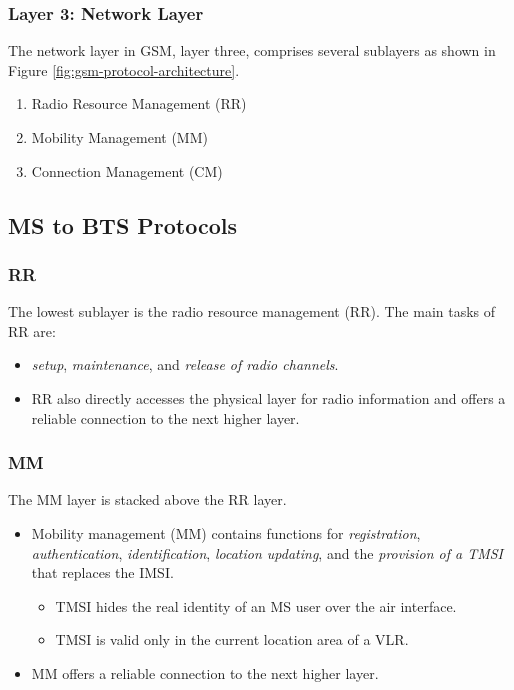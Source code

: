 

\subsubsection{Layer 3: Network Layer}
The network layer in GSM, layer three, comprises several sublayers as shown in Figure \ref{fig:gsm-protocol-architecture}.

\begin{enumerate}
	\item Radio Resource Management (RR)
	\item Mobility Management (MM)
	\item Connection Management (CM)
\end{enumerate}

\subsection{MS to BTS Protocols}

\subsubsection*{RR}
The lowest sublayer is the radio resource management (RR). The main tasks of RR are:
\begin{itemize}
	\item \textit{setup}, \textit{maintenance}, and \textit{release of radio channels}.
	\item RR also directly accesses the physical layer for radio information and offers a reliable connection to the next higher layer.
\end{itemize}

\subsubsection*{MM}
The MM layer is stacked above the RR layer.
 \begin{itemize}
 	\item Mobility management (MM) contains functions for \textit{registration}, \textit{authentication}, \textit{identification}, \textit{location updating}, and the \textit{provision of a TMSI} that replaces the IMSI.
 	\begin{itemize}
 		\item TMSI hides the real identity of an MS user over the air interface.
 		\item TMSI is valid only in the current location area of a VLR.
 	\end{itemize}
 	\item MM offers a reliable connection to the next higher layer.
 \end{itemize}

